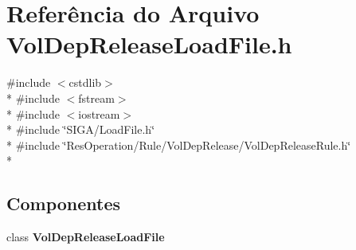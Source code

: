 \section{Referência do Arquivo Vol\+Dep\+Release\+Load\+File.\+h}
\label{_vol_dep_release_load_file_8h}
{\ttfamily \#include $<$cstdlib$>$}\\*
{\ttfamily \#include $<$fstream$>$}\\*
{\ttfamily \#include $<$iostream$>$}\\*
{\ttfamily \#include \char`\"{}S\+I\+G\+A/\+Load\+File.\+h\char`\"{}}\\*
{\ttfamily \#include \char`\"{}Res\+Operation/\+Rule/\+Vol\+Dep\+Release/\+Vol\+Dep\+Release\+Rule.\+h\char`\"{}}\\*
\subsection*{Componentes}
\begin{DoxyCompactItemize}
\item 
class {\bf Vol\+Dep\+Release\+Load\+File}
\end{DoxyCompactItemize}
